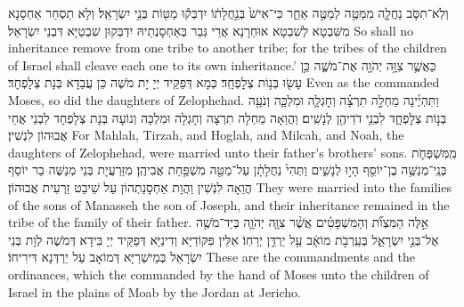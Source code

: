 {וְלֹֽא־תִסֹּ֧ב נַחֲלָ֛ה מִמַּטֶּ֖ה לְמַטֶּ֣ה אַחֵ֑ר כִּי־אִישׁ֙ בְּנַ֣חֲלָת֔וֹ יִדְבְּק֕וּ מַטּ֖וֹת בְּנֵ֥י יִשְׂרָאֵֽל׃}
{וְלָא תַסְחַר אַחְסָנָא מִשִּׁבְטָא לְשִׁבְטָא אוּחְרָנָא אֲרֵי גְּבַר בְּאַחְסָנְתֵיהּ יִדְבְּקוּן שִׁבְטַיָּא דִּבְנֵי יִשְׂרָאֵל׃}
{So shall no inheritance remove from one tribe to another tribe; for the tribes of the children of Israel shall cleave each one to its own inheritance.’}{}
{כַּאֲשֶׁ֛ר צִוָּ֥ה יְהֹוָ֖ה אֶת־מֹשֶׁ֑ה כֵּ֥ן עָשׂ֖וּ בְּנ֥וֹת צְלׇפְחָֽד׃}
{כְּמָא דְּפַקֵּיד יְיָ יָת מֹשֶׁה כֵּן עֲבַדָא בְּנָת צְלָפְחָד׃}
{Even as the \lord\space commanded Moses, so did the daughters of Zelophehad.}{}
{וַתִּהְיֶ֜ינָה מַחְלָ֣ה תִרְצָ֗ה וְחׇגְלָ֧ה וּמִלְכָּ֛ה וְנֹעָ֖ה בְּנ֣וֹת צְלׇפְחָ֑ד לִבְנֵ֥י דֹדֵיהֶ֖ן לְנָשִֽׁים׃
}
{וַהֲוַאָה מַחְלָה תִרְצָה וְחָגְלָה וּמִלְכָּה וְנוֹעָה בְּנָת צְלָפְחָד לִבְנֵי אֲחֵי אֲבוּהוֹן לִנְשִׁין׃}
{For Mahlah, Tirzah, and Hoglah, and Milcah, and Noah, the daughters of Zelophehad, were married unto their father’s brothers’ sons.}{}
{מִֽמִּשְׁפְּחֹ֛ת בְּנֵֽי־מְנַשֶּׁ֥ה בֶן־יוֹסֵ֖ף הָי֣וּ לְנָשִׁ֑ים וַתְּהִי֙ נַחֲלָתָ֔ן עַל־מַטֵּ֖ה מִשְׁפַּ֥חַת אֲבִיהֶֽן׃}
{מִזַּרְעֲיָת בְּנֵי מְנַשֶּׁה בַר יוֹסֵף הֲוַאָה לִנְשִׁין וַהֲוָת אַחְסָנַתְהוֹן עַל שֵׁיבַט זַרְעִית אֲבוּהוֹן׃}
{They were married into the families of the sons of Manasseh the son of Joseph, and their inheritance remained in the tribe of the family of their father.}{}
{אֵ֣לֶּה הַמִּצְוֺ֞ת וְהַמִּשְׁפָּטִ֗ים אֲשֶׁ֨ר צִוָּ֧ה יְהֹוָ֛ה בְּיַד־מֹשֶׁ֖ה אֶל־בְּנֵ֣י יִשְׂרָאֵ֑ל בְּעַֽרְבֹ֣ת מוֹאָ֔ב עַ֖ל יַרְדֵּ֥ן יְרֵחֽוֹ׃}
{אִלֵּין פִּקּוֹדַיָּא וְדִינַיָּא דְּפַקֵּיד יְיָ בִּידָא דְּמֹשֶׁה לְוָת בְּנֵי יִשְׂרָאֵל בְּמֵישְׁרַיָּא דְּמוֹאָב עַל יַרְדְּנָא דִּירִיחוֹ׃}
{These are the commandments and the ordinances, which the \lord\space commanded by the hand of Moses unto the children of Israel in the plains of Moab by the Jordan at Jericho.}{}
\newperek
